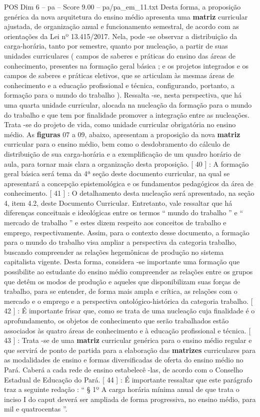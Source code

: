 \begin{textsample}{POS Dim 6 – pa – Score 9.00 – pa/pa\_em\_11.txt}
Desta forma, a proposição genérica da nova arquitetura do ensino médio apresenta uma \textbf{matriz} curricular ajustada, de organização anual e funcionamento semestral, de acordo com as orientações da Lei nº 13.415/2017.
Nela, pode -se observar a distribuição da carga-horária, tanto por semestre, quanto por nucleação, a partir de suas unidades curriculares ( campos de saberes e práticas do ensino das áreas de conhecimento, presentes na formação geral básica ; e os projetos integrados e os campos de saberes e práticas eletivos, que se articulam às mesmas áreas de conhecimento e a educação profissional e técnica, configurando, portanto, a formação para o mundo do trabalho ).
Ressalta -se, nesta perspectiva, que há uma quarta unidade curricular, alocada na nucleação da formação para o mundo do trabalho e que tem por finalidade promover a integração entre as nucleações.
Trata -se do projeto de vida, como unidade curricular obrigatória no ensino médio.
As \textbf{figuras} 07 a 09, abaixo, apresentam a proposição da nova \textbf{matriz} curricular para o ensino médio, bem como o desdobramento do cálculo de distribuição de sua carga-horária e a exemplificação de um quadro horário de aula, para tornar mais clara a organização desta proposição. [ 40 ] : A formação geral básica será tema da 4ª seção deste documento curricular, na qual se apresentará a concepção epistemológica e os fundamentos pedagógicos da área de conhecimento. [ 41 ] : O detalhamento desta nucleação será apresentado, na seção 4, item 4.2, deste Documento Curricular.
Entretanto, vale ressaltar que há diferenças conceituais e ideológicas entre os termos “ mundo do trabalho ” e “ mercado de trabalho ” e estes dizem respeito aos conceitos de trabalho e emprego, respectivamente.
Assim, para o contexto desse documento, a formação para o mundo do trabalho visa ampliar a perspectiva da categoria trabalho, buscando compreender as relações hegemônicas de produção no sistema capitalista vigente.
Desta forma, considera -se importante uma formação que possibilite ao estudante do ensino médio compreender as relações entre os grupos que detêm os modos de produção e aqueles que disponibilizam suas forças de trabalho, para se entender, de forma mais ampla e crítica, as relações com o mercado e o emprego e a perspectiva ontológico-histórica da categoria trabalho. [ 42 ] : É importante frisar que, como se trata de uma nucleação cuja finalidade é o aprofundamento, os objetos de conhecimento que serão trabalhados estão associados às quatro áreas de conhecimento e à educação profissional e técnica. [ 43 ] : Trata -se de uma \textbf{matriz} curricular genérica para o ensino médio regular e que servirá de ponto de partida para a elaboração das \textbf{matrizes} curriculares para as modalidades de ensino e formas diversificadas de oferta do ensino médio no Pará.
Caberá a cada rede de ensino estabelecê -las, de acordo com o Conselho Estadual de Educação do Pará. [ 44 ] : É importante ressaltar que este parágrafo traz a seguinte redação : “ § 1º A carga horária mínima anual de que trata o inciso I do caput deverá ser ampliada de forma progressiva, no ensino médio, para mil e quatrocentas ”.

\end{textsample}
